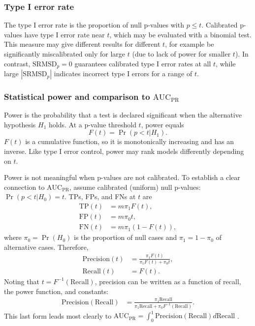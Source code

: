 \documentclass[11pt]{article}
\newcommand{\rmsd}{\text{SRMSD}_p}
\newcommand{\auc}{\text{AUC}_\text{PR}}
\begin{document}
\subsubsection{Type I error rate}

The type I error rate is the proportion of null p-values with $p \le t$.
Calibrated p-values have type I error rate near $t$, which may be evaluated with a binomial test.
This measure may give different results for different $t$, for example be significantly miscalibrated only for large $t$ (due to lack of power for smaller $t$).
In contrast, $\rmsd = 0$ guarantees calibrated type I error rates at all $t$, while large $|\rmsd|$ indicates incorrect type I errors for a range of $t$.

\subsubsection{Statistical power and comparison to $\auc$}

Power is the probability that a test is declared significant when the alternative hypothesis $H_1$ holds.
At a p-value threshold $t$, power equals
$$
F(t) = \Pr( p < t | H_1 ).
$$
$F(t)$ is a cumulative function, so it is monotonically increasing and has an inverse.
Like type I error control, power may rank models differently depending on $t$.

Power is not meaningful when p-values are not calibrated.
To establish a clear connection to $\auc$, assume calibrated (uniform) null p-values: $\Pr( p < t | H_0 ) = t$.
TPs, FPs, and FNs at $t$ are
\begin{align*}
  \text{TP}(t)
  &=
    m \pi_1 F(t)
    , \\
  \text{FP}(t)
  &=
    m \pi_0 t
    , \\
  \text{FN}(t)
  &=
    m \pi_1 ( 1 - F(t) )
    ,
\end{align*}
where $\pi_0 = \Pr( H_0 )$ is the proportion of null cases and $\pi_1 = 1 - \pi_0$ of alternative cases.
Therefore, 
\begin{align*}
  \text{Precision}(t)
  &=
    \frac{ \pi_1 F(t) }{ \pi_1 F(t) + \pi_0 t }
    , \\
  \text{Recall}(t)
  &=
    F(t)
    .
\end{align*}
Noting that $t = F^{-1}( \text{Recall} )$, precision can be written as a function of recall, the power function, and constants:
\begin{align*}
  \text{Precision}( \text{Recall} )
  &=
    \frac{ \pi_1 \text{Recall} }{ \pi_1 \text{Recall} + \pi_0 F^{-1}( \text{Recall} ) }
    .
\end{align*}
This last form leads most clearly to
$
\auc
=
\int_0^1 \text{Precision}( \text{Recall} ) d \text{Recall}
$
.
\end{document}
